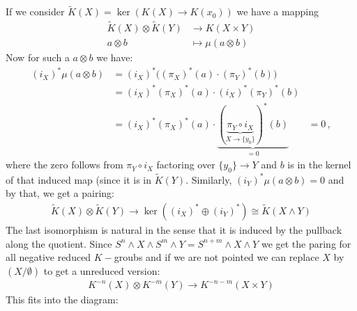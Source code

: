 \begin{definition}
	If we consider $\tilde{K}(X)=\ker(K(X)\to K(x_0))$ we have a mapping 
	\begin{align*}
		\tilde{K}(X)\otimes \tilde{K}(Y)&\to K(X\times Y)\\
		a\otimes b                      & \mapsto \mu(a\otimes b)
	\end{align*} Now for such a $a\otimes b$ we have: 
	\begin{align*}
		(i_X)^*\mu(a\otimes b)&=(i_X)^*\Big((\pi_X)^*(a)\cdot (\pi_Y)^*(b)\Big)&\\
		&= (i_X)^*(\pi_X)^*(a) \cdot (i_X)^*(\pi_Y)^*(b)& \\
		&=(i_X)^*(\pi_X)^*(a) \cdot \underbrace{(\underbrace{\pi_Y\circ i_X}_{X\to \{y_0\} })^*(b) }_{=0} &=0\, ,
	\end{align*}where the zero follows from $\pi_Y\circ i_X$ factoring over $\{y_0\}\to Y$ and $b$ is in the kernel of that induced map (since it is in $\tilde{K}(Y)$. Similarly, $(i_Y)^*\mu(a\otimes b)=0$ and by that, we get a pairing: 
	\begin{align*}
		\tilde{K}(X)\otimes \tilde{K}(Y)\to \ker((i_X)^*\oplus (i_Y)^*)\cong \tilde{K}(X\wedge Y)
	\end{align*} The last isomorphism is natural in the sense that it is induced by the pullback along the quotient. Since $S^n\wedge X\wedge S^m\wedge Y=S^{n+m}\wedge X\wedge Y$ we get the paring for all negative reduced $K-$groubs and if we are not pointed we can replace $X$ by $(X\slash \emptyset)$ to get a unreduced version:
	\begin{align*}
		K^{-n}(X)\otimes K^{-m}(Y)\to K^{-n-m}(X\times Y)
	\end{align*} This fits into the diagram: 
\end{definition}
\begin{cor}
	
\end{cor}